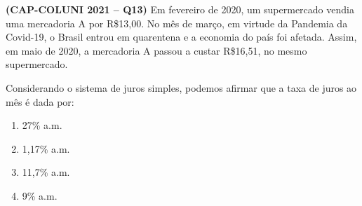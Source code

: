 \textbf{(CAP-COLUNI 2021 -- Q13)} Em fevereiro de 2020, um supermercado vendia uma mercadoria A por R\$13,00. No mês de março, em virtude da Pandemia da Covid-19, o Brasil entrou em quarentena e a economia do país foi afetada. Assim, em maio de 2020, a mercadoria A passou a custar R\$16,51, no mesmo supermercado.

Considerando o sistema de juros simples, podemos afirmar que a taxa de juros ao mês é dada por:

\begin{enumerate}
	\item 27\% a.m.
	\item 1,17\% a.m.
	\item 11,7\% a.m.
	\item 9\% a.m.
\end{enumerate}
